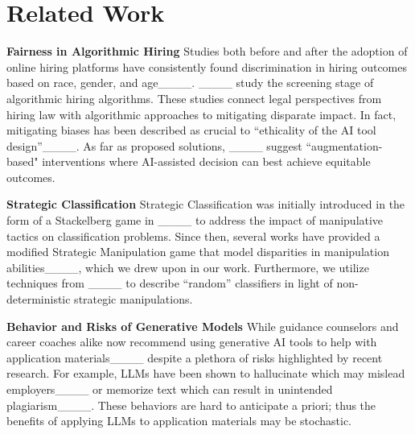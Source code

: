\section{Related Work}
\label{sec: related work}

\textbf{Fairness in Algorithmic Hiring} Studies both before and after the adoption of online hiring platforms have consistently found discrimination in hiring outcomes based on race, gender, and age____.  ____ study the screening stage of algorithmic hiring algorithms. These studies connect legal perspectives from hiring law with algorithmic approaches to mitigating disparate impact. In fact, mitigating biases has been described as crucial to ``ethicality of the AI tool design''____. As far as proposed solutions, ____ suggest ``augmentation-based" interventions where AI-assisted decision can best achieve equitable outcomes. 

\textbf{Strategic Classification}
Strategic Classification was initially introduced in the form of a Stackelberg game in ____ to address the impact of manipulative tactics on classification problems. Since then, several works have provided a modified Strategic Manipulation game that model disparities in manipulation abilities____, which we drew upon in our work. Furthermore, we utilize techniques from ____ to describe ``random'' classifiers in light of non-deterministic strategic manipulations. 

\textbf{Behavior and Risks of Generative Models} While guidance counselors and career coaches alike now recommend using generative AI tools to help with application materials____ despite a plethora of risks highlighted by recent research. For example, LLMs have been shown to hallucinate which may mislead employers____ or memorize text which can result in unintended plagiarism____. These behaviors are hard to anticipate a priori; thus the benefits of applying LLMs to application materials may be stochastic. 




